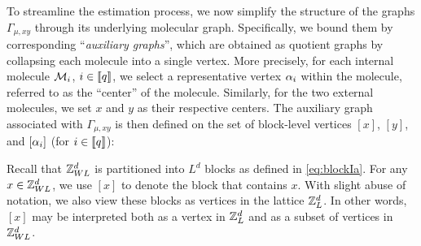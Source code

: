 To streamline the estimation process, we now simplify the structure of the graphs $\Gamma_{\mu,xy}$ through its underlying molecular graph.
Specifically, we bound them by corresponding ``\emph{auxiliary graphs}'', which are obtained as quotient graphs by collapsing each molecule into a single vertex. 
More precisely, for each internal molecule $\mathcal{M}_i$, $i\in \llbracket{q}\rrbracket$, we select a representative vertex $\alpha_i$ within the molecule, referred to as the ``center'' of the molecule. Similarly, for the two external molecules, we set $x$ and $y$ as their respective centers. The auxiliary graph associated with $\Gamma_{\mu,xy}$ is then defined on the set of block-level vertices $[x]$, $[y]$, and $[\alpha_i]$ (for $i\in \llbracket{q}\rrbracket$): %

\begin{definition} \label{def: BM2}
Recall that ${\mathbb Z}_{WL}^d$ is partitioned into $L^d$ blocks as defined in \eqref{eq:blockIa}. For any $x\in {\mathbb Z}_{WL}^d$, we use $[x]$ to denote the block that contains $x$. 
With slight abuse of notation, we also view these blocks as vertices in the lattice ${\mathbb Z}_L^d$. In other words, $[x]$ may be interpreted both as a vertex in ${\mathbb Z}_L^d$ and as a subset of vertices in ${\mathbb Z}_{WL}^d$. 

\end{definition}


